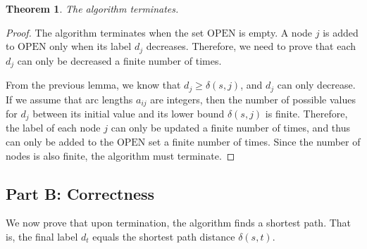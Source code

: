 \documentclass[11pt, a4paper, oneside]{memoir}
\newtheorem{theorem}{Theorem}
\newcommand{\OPEN}{\text{OPEN}}
\begin{document}
\begin{theorem}
The algorithm terminates.
\end{theorem}

\begin{proof}
The algorithm terminates when the set $\OPEN$ is empty.
A node $j$ is added to $\OPEN$ only when its label $d_j$ decreases.
Therefore, we need to prove that each $d_j$ can only be decreased a finite number of times.

From the previous lemma, we know that $d_j \geq \delta(s, j)$, and $d_j$ can only decrease.
If we assume that arc lengths $a_{ij}$ are integers, then the number of possible values for $d_j$
between its initial value and its lower bound $\delta(s, j)$ is finite.
Therefore, the label of each node $j$ can only be updated a finite number of times,
and thus can only be added to the $\OPEN$ set a finite number of times.
Since the number of nodes is also finite, the algorithm must terminate.
\end{proof}

\subsection*{Part B: Correctness}
We now prove that upon termination, the algorithm finds a shortest path.
That is, the final label $d_t$ equals the shortest path distance $\delta(s, t)$.
\end{document}
